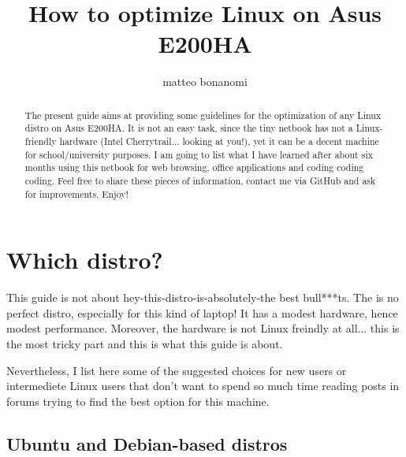\documentclass{article}
\begin{document}
\title{How to optimize Linux on Asus E200HA}
\author{matteo bonanomi}


\maketitle

\begin{abstract}
The present guide aims at providing some guidelines for the optimization of any Linux distro on Asus E200HA. It is not an easy task, since the tiny netbook has not a Linux-friendly hardware (Intel Cherrytrail... looking at you!), yet it can be a decent machine for school/university purposes. I am going to list what I have learned after about six months using this netbook for web browsing, office applications and coding coding coding. Feel free to share these pieces of information, contact me via GitHub and ask for improvements. Enjoy!
\end{abstract}

\tableofcontents

\newpage


\section{Which distro?}
This guide is not about hey-this-distro-is-absolutely-the best bull***ts. The is no perfect distro, especially for this kind of laptop! It has a modest hardware, hence modest performance. Moreover, the hardware is not Linux freindly at all... this is the most tricky part and this is what this guide is about. 

Nevertheless, I list here some of the suggested choices for new users or intermediete Linux users that don't want to spend so much time reading posts in forums trying to find the best option for this machine. 

\subsection{Ubuntu and Debian-based distros}
\end{document}
